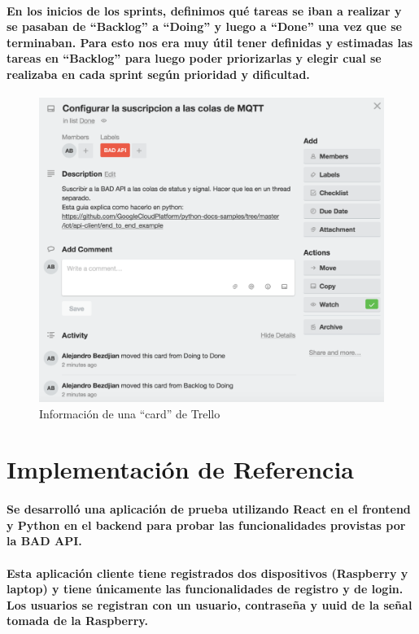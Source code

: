 \documentclass{article}
\begin{document}
\paragraph{
En los inicios de los sprints, definimos qué tareas se iban a realizar y se pasaban de “Backlog” a “Doing” y luego a “Done” una vez que se terminaban. Para esto nos era muy útil tener definidas y estimadas las tareas en “Backlog” para luego poder priorizarlas y elegir cual se realizaba en cada sprint según prioridad y dificultad.
}

\begin{figure}[ht]
    \centering
    \includegraphics[width=\textwidth]{trellocard.png}%
    \caption{Información de una “card” de Trello}
\end{figure}

\section{Implementación de Referencia}
\paragraph{
Se desarrolló una aplicación de prueba utilizando React en el frontend y Python en el backend para probar las funcionalidades provistas por la BAD API.
}
\paragraph{
Esta aplicación cliente tiene registrados dos dispositivos (Raspberry y laptop) y tiene únicamente las funcionalidades de registro y de login. Los usuarios se registran con un usuario, contraseña y uuid de la señal tomada de la Raspberry.
}
\end{document}
